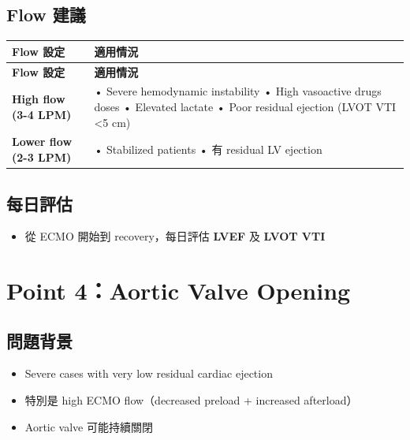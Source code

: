 \documentclass[12pt,a4paper]{article}
\begin{document}
\subsection{Flow 建議}

\begin{longtable}{p{4cm}p{10cm}}
\toprule
\textbf{Flow 設定} & \textbf{適用情況} \\
\midrule
\endfirsthead

\toprule
\textbf{Flow 設定} & \textbf{適用情況} \\
\midrule
\endhead

\bottomrule
\endfoot

\textbf{High flow (3-4 LPM)} &
• Severe hemodynamic instability\newline
• High vasoactive drugs doses\newline
• Elevated lactate\newline
• Poor residual ejection (LVOT VTI <5 cm) \\
\midrule
\textbf{Lower flow (2-3 LPM)} &
• Stabilized patients\newline
• 有 residual LV ejection \\
\bottomrule
\end{longtable}

\subsection{每日評估}

\begin{itemize}
    \item 從 ECMO 開始到 recovery，每日評估 \textbf{LVEF} 及 \textbf{LVOT VTI}
\end{itemize}

\section{Point 4：Aortic Valve Opening}

\subsection{問題背景}

\begin{itemize}
    \item Severe cases with very low residual cardiac ejection
    \item 特別是 high ECMO flow（decreased preload + increased afterload）
    \item Aortic valve 可能持續關閉
\end{itemize}
\end{document}
